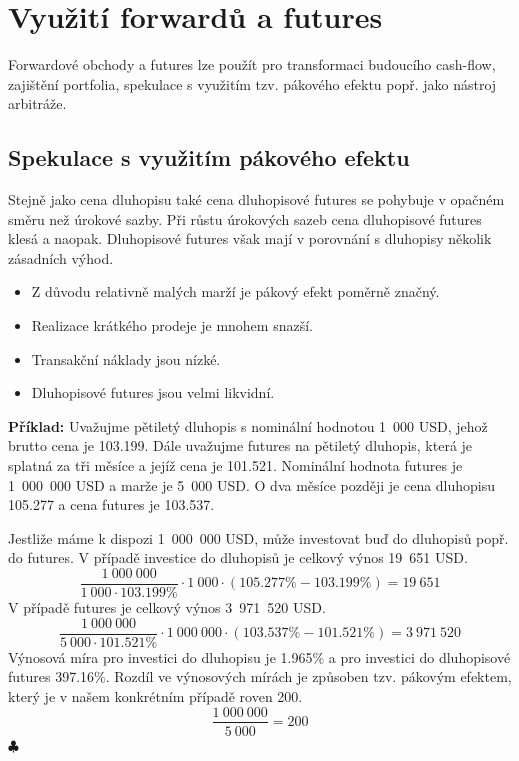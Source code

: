 \documentclass[a4paper]{book}
\begin{document}
\section{Využití forwardů a futures}

Forwardové obchody a futures lze použít pro transformaci budoucího cash-flow, zajištění portfolia, spekulace s využitím tzv. pákového efektu popř. jako nástroj arbitráže.

\subsection{Spekulace s využitím pákového efektu}

Stejně jako cena dluhopisu také cena dluhopisové futures se pohybuje v opačném směru než úrokové sazby. Při růstu úrokových sazeb cena dluhopisové futures klesá a naopak. Dluhopisové futures však mají v porovnání s dluhopisy několik zásadních výhod.
\begin{itemize}
\item Z důvodu relativně malých marží je pákový efekt poměrně značný.
\item Realizace krátkého prodeje je mnohem snazší.
\item Transakční náklady jsou nízké.
\item Dluhopisové futures jsou velmi likvidní.
\end{itemize}

\noindent \textbf{Příklad:} Uvažujme pětiletý dluhopis s nominální hodnotou 1~000 USD, jehož brutto cena je 103.199. Dále uvažujme futures na pětiletý dluhopis, která je splatná za tři měsíce a jejíž cena je 101.521. Nominální hodnota futures je 1~000~000 USD a marže je 5~000 USD. O dva měsíce později je cena dluhopisu 105.277 a cena futures je 103.537.

Jestliže máme k dispozi 1~000~000 USD, může investovat buď do dluhopisů popř. do futures. V případě investice do dluhopisů je celkový výnos 19~651 USD.
\begin{equation*}
\frac{1~000~000}{1~000 \cdot 103.199\%} \cdot 1~000 \cdot (105.277\% - 103.199\%) = 19~651
\end{equation*}
V případě futures je celkový výnos 3~971~520 USD.
\begin{equation*}
\frac{1~000~000}{5~000 \cdot 101.521\%} \cdot 1~000~000 \cdot (103.537\% - 101.521\%) = 3~971~520
\end{equation*}
Výnosová míra pro investici do dluhopisu je 1.965\% a pro investici do dluhopisové futures 397.16\%. Rozdíl ve výnosových mírách je způsoben tzv. pákovým efektem, který je v našem konkrétním případě roven 200.
\begin{equation*}
\frac{1~000~000}{5~000} = 200
\end{equation*}
$\clubsuit$
\end{document}
